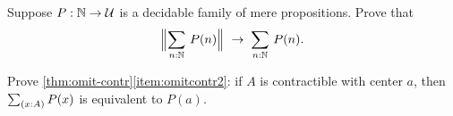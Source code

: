 \begin{ex}\label{ex:decidable-choice}
  Suppose $P:\mathbb{N}\to\mathcal{U}$ is a decidable family of mere propositions.
  Prove that
  \[ \Brck{\sm{n:\nat} P(n)} \;\to\; \sm{n:\nat}P(n).\]
\end{ex}

\begin{ex}\label{ex:omit-contr2}
  Prove \autoref{thm:omit-contr}\ref{item:omitcontr2}: if $A$ is contractible with center $a$, then $\sm{x:A} P(x)$ is equivalent to $P(a)$.
\end{ex}


